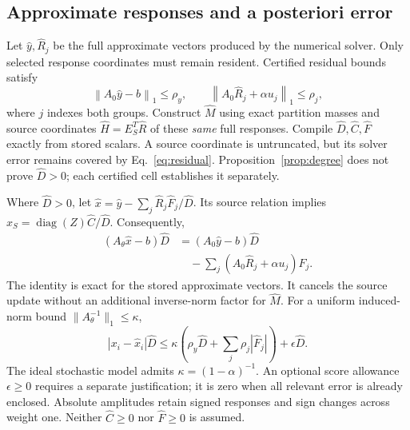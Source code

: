 \documentclass[conference]{IEEEtran}
\newcommand{\norm}[1]{\left\lVert#1\right\rVert_1}
\begin{document}
\subsection{Approximate responses and a posteriori error}
\label{sec:posterior}
Let $\widehat y,\widehat R_j$ be the full approximate vectors produced by the numerical solver. Only selected response coordinates must remain resident. Certified residual bounds satisfy
\begin{equation}
 \norm{A_0\widehat y-b}\leq\rho_y,\qquad
 \norm{A_0\widehat R_j+\alpha u_j}\leq\rho_j,
 \label{eq:residual}
\end{equation}
where $j$ indexes both groups. Construct $\widehat M$ using exact partition masses and source coordinates $\widehat H=E_S^T\widehat R$ of these \emph{same} full responses. Compile $\widehat D,\widehat C,\widehat F$ exactly from stored scalars. A source coordinate is untruncated, but its solver error remains covered by Eq.~\eqref{eq:residual}. Proposition~\ref{prop:degree} does not prove $\widehat D>0$; each certified cell establishes it separately.

Where $\widehat D>0$, let $\widehat x=\widehat y-\sum_j\widehat R_j\widehat F_j/\widehat D$. Its source relation implies $\widehat x_S=\operatorname{diag}(Z)\widehat C/\widehat D$. Consequently,
\begin{equation}
 \begin{aligned}
 (A_\theta\widehat x-b)\widehat D
 &= (A_0\widehat y-b)\widehat D\\
 &\quad-\sum_j(A_0\widehat R_j+\alpha u_j)\widehat F_j.
 \end{aligned}
 \label{eq:cancellation}
\end{equation}
The identity is exact for the stored approximate vectors. It cancels the source update without an additional inverse-norm factor for $\widehat M$. For a uniform induced-norm bound $\|A_\theta^{-1}\|_1\leq\kappa$,
\begin{equation}
 |x_i-\widehat x_i|\widehat D
 \leq\kappa\left(\rho_y\widehat D+\sum_j\rho_j|\widehat F_j|\right)
       +\epsilon\widehat D.
 \label{eq:posterior}
\end{equation}
The ideal stochastic model admits $\kappa=(1-\alpha)^{-1}$. An optional score allowance $\epsilon\geq0$ requires a separate justification; it is zero when all relevant error is already enclosed. Absolute amplitudes retain signed responses and sign changes across weight one. Neither $\widehat C\geq0$ nor $\widehat F\geq0$ is assumed.
\end{document}

